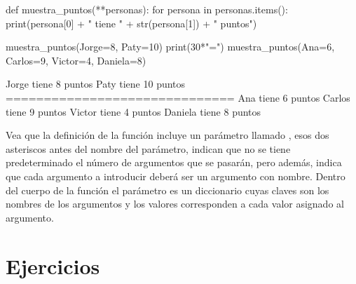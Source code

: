 \begin{python}
def muestra_puntos(**personas):
    for persona in personas.items():
        print(persona[0] + " tiene " + str(persona[1]) + " puntos")

muestra_puntos(Jorge=8, Paty=10)
print(30*"=")
muestra_puntos(Ana=6, Carlos=9, Victor=4, Daniela=8)
\end{python}
\begin{outscript}
Jorge tiene 8 puntos
Paty tiene 10 puntos
==============================
Ana tiene 6 puntos
Carlos tiene 9 puntos
Victor tiene 4 puntos
Daniela tiene 8 puntos
\end{outscript}

Vea que la definición de la función  incluye un parámetro llamado , esos dos 
asteriscos antes del nombre del parámetro, indican que no se tiene predeterminado el número de argumentos que se 
pasarán, pero además, indica que cada argumento a introducir deberá ser un argumento con nombre.
Dentro del cuerpo de la función el parámetro  es un diccionario cuyas claves 
son los nombres de los argumentos y los valores corresponden a cada valor asignado al argumento.



\section{Ejercicios}


